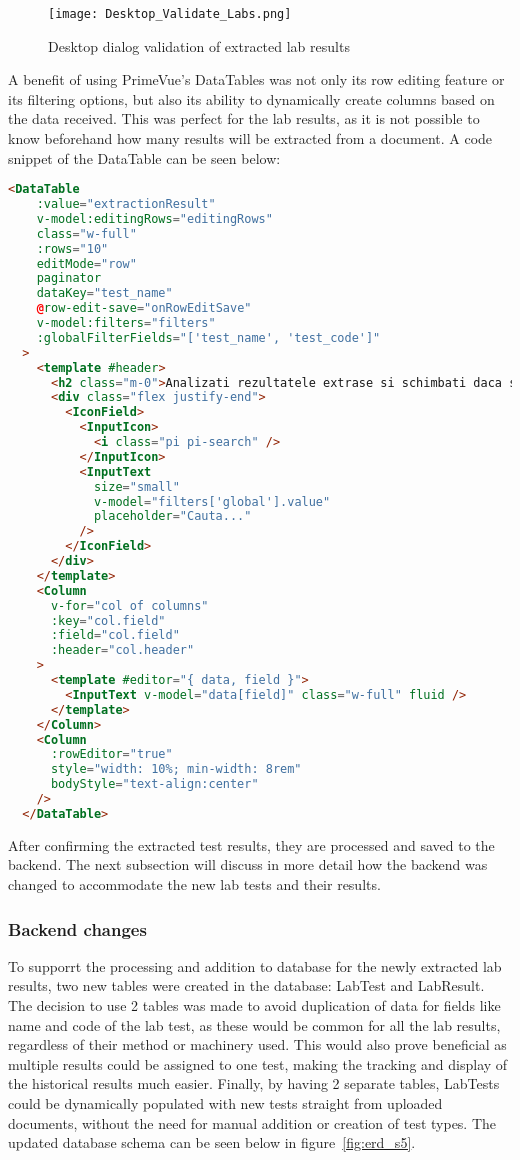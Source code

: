 \begin{figure}[htbp]
  \centering
  \texttt{[image: Desktop\_Validate\_Labs.png]}
  \caption{Desktop dialog validation of extracted lab results}\label{fig:labs_extracted}
\end{figure}

A benefit of using PrimeVue's DataTables was not only its row editing feature or its filtering options, but also its ability to dynamically create columns based on the data received. This was perfect for the lab results, as it is not possible to know beforehand how many results will be extracted from a document. A code snippet of the DataTable can be seen below:

\begin{lstlisting}[language=HTML, caption=Dynamic DataTable for Lab Results]
  <DataTable
    :value="extractionResult"
    v-model:editingRows="editingRows"
    class="w-full"
    :rows="10"
    editMode="row"
    paginator
    dataKey="test_name"
    @row-edit-save="onRowEditSave"
    v-model:filters="filters"
    :globalFilterFields="['test_name', 'test_code']"
  >
    <template #header>
      <h2 class="m-0">Analizati rezultatele extrase si schimbati daca sunt gresite</h2>
      <div class="flex justify-end">
        <IconField>
          <InputIcon>
            <i class="pi pi-search" />
          </InputIcon>
          <InputText
            size="small"
            v-model="filters['global'].value"
            placeholder="Cauta..."
          />
        </IconField>
      </div>
    </template>
    <Column 
      v-for="col of columns" 
      :key="col.field" 
      :field="col.field" 
      :header="col.header"
    >
      <template #editor="{ data, field }">
        <InputText v-model="data[field]" class="w-full" fluid />
      </template>
    </Column>
    <Column
      :rowEditor="true"
      style="width: 10%; min-width: 8rem"
      bodyStyle="text-align:center"
    />
  </DataTable>
\end{lstlisting}

After confirming the extracted test results, they are processed and saved to the backend. The next subsection will discuss in more detail how the backend was changed to accommodate the new lab tests and their results.

\subsubsection{Backend changes}

To supporrt the processing and addition to database for the newly extracted lab results, two new tables were created in the database: LabTest and LabResult. The decision to use 2 tables was made to avoid duplication of data for fields like name and code of the lab test, as these would be common for all the lab results, regardless of their method or machinery used. This would also prove beneficial as multiple results could be assigned to one test, making the tracking and display of the historical results much easier. Finally, by having 2 separate tables, LabTests could be dynamically populated with new tests straight from uploaded documents, without the need for manual addition or creation of test types. The updated database schema can be seen below in figure~\ref{fig:erd_s5}.

